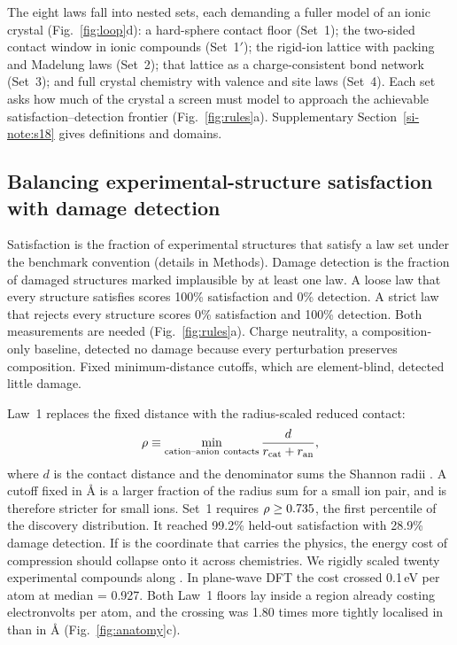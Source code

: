 The eight laws fall into nested sets, each demanding a fuller model of an ionic crystal
(Fig.~\ref{fig:loop}d): a hard-sphere contact floor (Set~1); the two-sided contact window in ionic
compounds (Set~1$'$); the rigid-ion lattice with packing and Madelung laws (Set~2); that
lattice as a charge-consistent bond network (Set~3); and full crystal chemistry with
valence and site laws (Set~4). Each set asks how much of the crystal a screen must model to
approach the achievable satisfaction--detection frontier (Fig.~\ref{fig:rules}a).
Supplementary Section~\ref{si-note:s18} gives definitions and domains.

\FloatBarrier
\subsection{Balancing experimental-structure satisfaction with damage detection}
\label{sec:rules}\label{sec:core}\label{sec:d1}\label{sec:d2}\label{sec:l4}

Satisfaction is the fraction of experimental structures that satisfy a law set under the
benchmark convention (details in Methods). Damage detection is the fraction of damaged structures
marked implausible by at least one law. A loose law that every structure satisfies scores
100\% satisfaction and 0\% detection. A strict law that rejects every structure scores
0\% satisfaction and 100\% detection. Both measurements are needed
(Fig.~\ref{fig:rules}a). Charge neutrality, a composition-only baseline, detected no
damage because every perturbation preserves composition. Fixed minimum-distance cutoffs, which are
element-blind, detected little damage.

Law~1 replaces the fixed distance with the radius-scaled reduced contact:
\begin{equation}
  \rho \equiv \min_{\mathrm{cation\text{--}anion\ contacts}}
  \frac{d}{r_{\mathrm{cat}}+r_{\mathrm{an}}},
  \label{eq:rho}
\end{equation}
where \(d\) is the contact distance and the denominator sums the Shannon radii
\cite{shannon1976revised}. A cutoff fixed in \AA{} is a larger fraction of the radius sum for a small ion pair, and
is therefore stricter for small ions. Set~1 requires \(\rho\geq0.735\), the first percentile
of the discovery distribution. It reached 99.2\% held-out satisfaction with 28.9\% damage
detection. If \rhoc{} is the coordinate that carries the physics, the energy cost of
compression should collapse onto it across chemistries. We rigidly scaled twenty experimental compounds
along \rhoc{}. In plane-wave DFT the cost crossed
0.1\,eV per atom at median \rhoc{} = 0.927. Both Law~1 floors lay inside a region already
costing electronvolts per atom, and the crossing was 1.80 times more tightly localised in
\rhoc{} than in \AA{} (Fig.~\ref{fig:anatomy}c).


